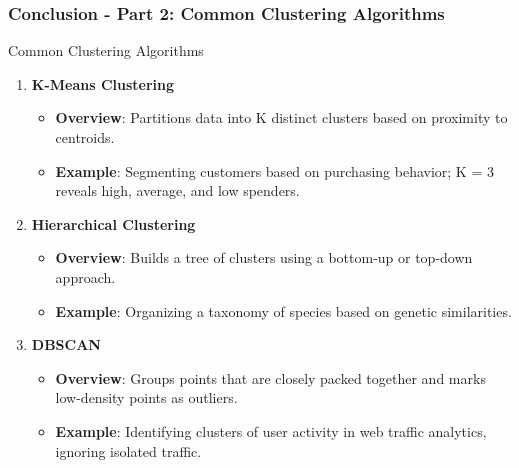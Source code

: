 \documentclass[aspectratio=169]{beamer}
\begin{document}
\begin{frame}[fragile]
  \frametitle{Conclusion - Part 2: Common Clustering Algorithms}
  
  \begin{block}{Common Clustering Algorithms}
      \begin{enumerate}
          \item \textbf{K-Means Clustering}
              \begin{itemize}
                  \item \textbf{Overview}: Partitions data into K distinct clusters based on proximity to centroids.
                  \item \textbf{Example}: Segmenting customers based on purchasing behavior; K = 3 reveals high, average, and low spenders.
              \end{itemize}
          \item \textbf{Hierarchical Clustering}
              \begin{itemize}
                  \item \textbf{Overview}: Builds a tree of clusters using a bottom-up or top-down approach.
                  \item \textbf{Example}: Organizing a taxonomy of species based on genetic similarities.
              \end{itemize}
          \item \textbf{DBSCAN}
              \begin{itemize}
                  \item \textbf{Overview}: Groups points that are closely packed together and marks low-density points as outliers.
                  \item \textbf{Example}: Identifying clusters of user activity in web traffic analytics, ignoring isolated traffic.
              \end{itemize}
      \end{enumerate}
  \end{block}
\end{frame}
\end{document}
